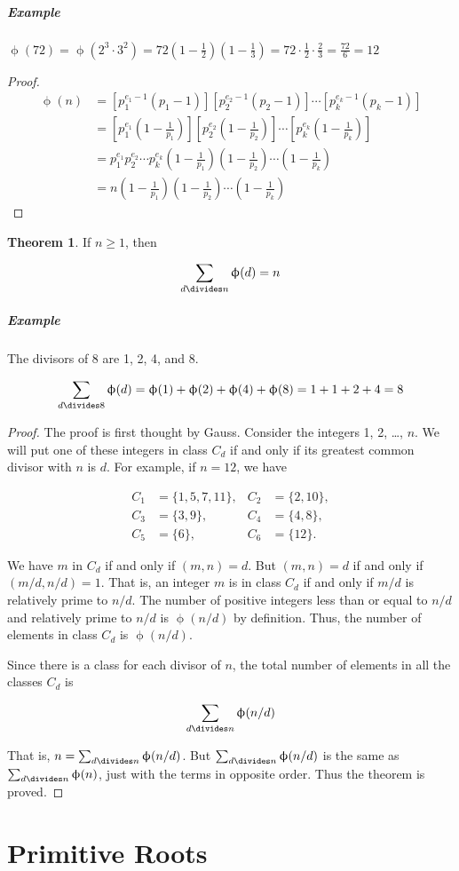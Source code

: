 \documentclass{article}
\theoremstyle{definition} %
\newtheorem{theorem}{Theorem}[section] %
\theoremstyle{definition}
\theoremstyle{definition}
\newcommand{\tot}{\upphi}
\theoremstyle{definition}
\begin{document}
  \subparagraph{Example} $\tot(72) = \tot(2^3 \cdot 3^2) = 72(1 - \frac{1}{2})(1 - \frac{1}{3}) = 72\cdot\frac{1}{2}\cdot\frac{2}{3}
  = \frac{72}{6} = 12$
  
  \begin{proof}
    \begin{align*}
      \tot(n) &= \left[p_1^{e_1-1}(p_1-1)\right] \left[p_2^{e_2-1}(p_2-1)\right] \cdots \left[p_k^{e_k-1}(p_k-1)\right] \\
        &= \left[p_1^{e_1}\left(1-\frac{1}{p_1}\right)\right] \left[p_2^{e_2}\left(1-\frac{1}{p_2}\right)\right] \cdots \left[p_k^{e_k}\left(1-\frac{1}{p_k}\right)\right] \\
        &= p_1^{e_1} p_2^{e_2} \cdots p_k^{e_k} \left( 1 - \frac{1}{p_1}\right) \left(1 - \frac{1}{p_2}\right)\cdots\left(1 - \frac{1}{p_k}\right) \\
        &= n\left( 1 - \frac{1}{p_1}\right) \left(1 - \frac{1}{p_2}\right)\cdots\left(1 - \frac{1}{p_k}\right)
    \end{align*}
  \end{proof}
  
  \begin{theorem}
    If $n \geq 1$, then
    
    \[ \sum_{d \divides n}\tot(d) = n \]
  \end{theorem}
  
  \subparagraph{Example} The divisors of 8 are 1, 2, 4, and 8.
  
  \[ \sum_{d \divides 8}\tot(d) = \tot(1) + \tot(2) + \tot(4) + \tot(8) = 1 + 1 + 2 + 4 = 8 \]
  
  \begin{proof}
    The proof is first thought by Gauss. Consider the integers 1, 2, \dots, $n$. We will put one of
    these integers in class $C_d$ if and only if its greatest common divisor with $n$ is $d$.
    For example, if $n = 12$, we have
    
    \begin{align*}
      C_1 &= \{1, 5, 7, 11\},& C_2 &= \{2, 10\}, \\
      C_3 &= \{3, 9\},& C_4 &= \{4, 8\}, \\
      C_5 &= \{6\},& C_6 &= \{12\}.
    \end{align*}
    
    We have $m$ in $C_d$ if and only if $(m, n) = d$. But $(m, n) = d$ if and only if
    $(m/d, n/d) = 1$. That is, an integer $m$ is in class $C_d$ if and only if $m/d$ is
    relatively prime to $n/d$. The number of positive integers less than or equal to
    $n/d$ and relatively prime to $n/d$ is $\tot(n/d)$ by definition. Thus, the number
    of elements in class $C_d$ is $\tot(n/d)$.
    
    Since there is a class for each divisor of $n$, the total number of elements in all
    the classes $C_d$ is
    
    \[ \sum_{d\divides n}\tot(n/d) \]
    
    That is, $n = \sum_{d\divides n}\tot(n/d)$. But $\sum_{d\divides n}\tot(n/d)$ is
    the same as $\sum_{d\divides n}\tot(n)$, just with the terms in opposite order.
    Thus the theorem is proved.
  \end{proof}
  
  \section{Primitive Roots}
  

  
\end{document}
